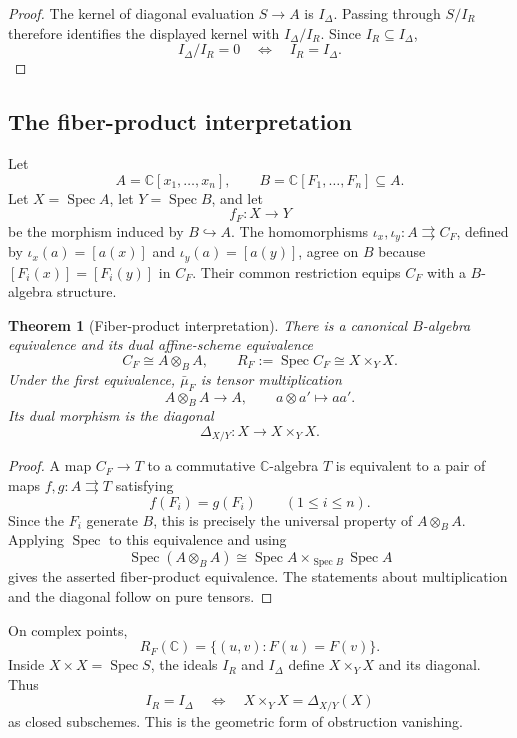 \documentclass[11pt]{article}
\newtheorem{theorem}{Theorem}[section]
\theoremstyle{remark}
\theoremstyle{definition}
\DeclareMathOperator{\Spec}{Spec}
\newcommand{\C}{\mathbb C}
\begin{document}
\begin{proof}
The kernel of diagonal evaluation \(S\to A\) is \(I_\Delta\).  Passing
through \(S/I_R\) therefore identifies the displayed kernel with
\(I_\Delta/I_R\).  Since \(I_R\subseteq I_\Delta\),
\[
  I_\Delta/I_R=0
  \quad\Longleftrightarrow\quad
  I_R=I_\Delta.
\]
\end{proof}

\subsection{The fiber-product interpretation}
\label{sec:fiber-product}

Let
\[
  A=\C[x_1,\dots,x_n],\qquad
  B=\C[F_1,\dots,F_n]\subseteq A.
\]
Let \(X=\Spec A\), let \(Y=\Spec B\), and let
\[
  f_F\colon X\longrightarrow Y
\]
be the morphism induced by \(B\hookrightarrow A\).
The homomorphisms
\(\iota_x,\iota_y\colon A\rightrightarrows C_F\), defined by
\(\iota_x(a)=[a(x)]\) and \(\iota_y(a)=[a(y)]\), agree on \(B\) because
\([F_i(x)]=[F_i(y)]\) in \(C_F\).  Their common restriction equips
\(C_F\) with a \(B\)-algebra structure.

\begin{theorem}[Fiber-product interpretation]
\label{thm:collision-tensor-product}
There is a canonical \(B\)-algebra equivalence and its dual
affine-scheme equivalence
\[
  C_F\cong A\otimes_B A,
  \qquad
  R_F:=\Spec C_F\cong X\times_YX.
\]
Under the first equivalence, \(\bar\mu_F\) is tensor multiplication
\[
  A\otimes_BA\longrightarrow A,\qquad a\otimes a'\longmapsto aa'.
\]
Its dual morphism is the diagonal
\[
  \Delta_{X/Y}\colon X\longrightarrow X\times_YX.
\]
\end{theorem}

\begin{proof}
A map \(C_F\to T\) to a commutative \(\C\)-algebra \(T\) is equivalent
to a pair of maps \(f,g\colon A\rightrightarrows T\) satisfying
\[
  f(F_i)=g(F_i)\qquad(1\leq i\leq n).
\]
Since the \(F_i\) generate \(B\), this is precisely the universal
property of \(A\otimes_BA\).  Applying \(\Spec\) to this equivalence and
using
\[
  \Spec(A\otimes_BA)
  \cong
  \Spec A\times_{\Spec B}\Spec A
\]
gives the asserted fiber-product equivalence.
The statements about multiplication and the diagonal follow on pure
tensors.
\end{proof}

On complex points,
\[
  R_F(\C)=\{(u,v):F(u)=F(v)\}.
\]
Inside \(X\times X=\Spec S\), the ideals \(I_R\) and \(I_\Delta\)
define \(X\times_YX\) and its diagonal.  Thus
\[
  I_R=I_\Delta
  \quad\Longleftrightarrow\quad
  X\times_YX=\Delta_{X/Y}(X)
\]
as closed subschemes.  This is the geometric form of obstruction
vanishing.
\end{document}

